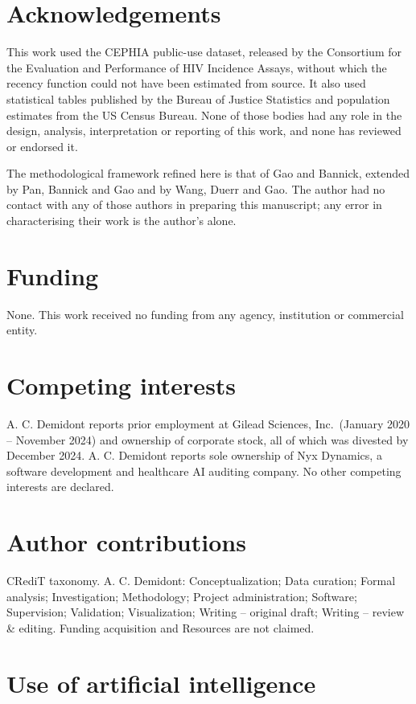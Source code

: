 \section{Acknowledgements}

This work used the CEPHIA public-use dataset, released by the Consortium for the Evaluation and Performance of HIV Incidence Assays, without which the recency function could not have been estimated from source. It also used statistical tables published by the Bureau of Justice Statistics and population estimates from the US Census Bureau. None of those bodies had any role in the design, analysis, interpretation or reporting of this work, and none has reviewed or endorsed it.

The methodological framework refined here is that of Gao and Bannick, extended by Pan, Bannick and Gao and by Wang, Duerr and Gao. The author had no contact with any of those authors in preparing this manuscript; any error in characterising their work is the author's alone.

\section{Funding}

None. This work received no funding from any agency, institution or commercial entity.

\section{Competing interests}

A. C. Demidont reports prior employment at Gilead Sciences, Inc.~(January 2020 -- November 2024) and ownership of corporate stock, all of which was divested by December 2024. A. C. Demidont reports sole ownership of Nyx Dynamics, a software development and healthcare AI auditing company. No other competing interests are declared.

\section{Author contributions}

CRediT taxonomy. A. C. Demidont: Conceptualization; Data curation; Formal analysis; Investigation; Methodology; Project administration; Software; Supervision; Validation; Visualization; Writing -- original draft; Writing -- review \& editing. Funding acquisition and Resources are not claimed.

\section{Use of artificial intelligence}


